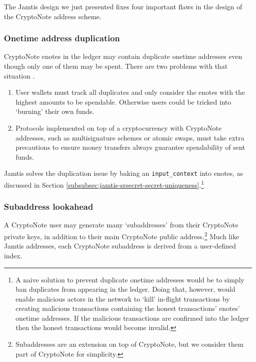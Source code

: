The Jamtis design we just presented fixes four important flaws in the design of the CryptoNote address scheme.

\subsubsection{Onetime address duplication}
\label{subsubsec:jamtis-cryptonote-flaws-duplication}

CryptoNote enotes in the ledger may contain duplicate onetime addresses even though only one of them may be spent. There are two problems with that situation \cite{burning-bug-mrl-103}.
\begin{enumerate}
    \item User wallets must track all duplicates and only consider the enotes with the highest amounts to be spendable. Otherwise users could be tricked into `burning' their own funds.
    \item Protocols implemented on top of a cryptocurrency with CryptoNote addresses, such as multisignature schemes or atomic swaps, must take extra precautions to ensure money transfers always guarantee spendability of sent funds.
\end{enumerate}

Jamtis solves the duplication issue by baking an {\tt input\_context} into enotes, as discussed in Section \ref{subsubsec:jamtis-srsecret-secret-uniqueness}.\footnote{A naive solution to prevent duplicate onetime addresses would be to simply ban duplicates from appearing in the ledger. Doing that, however, would enable malicious actors in the network to `kill' in-flight transactions by creating malicious transactions containing the honest transactions' enotes' onetime addresses. If the malicious transactions are confirmed into the ledger then the honest transactions would become invalid.}

\subsubsection{Subaddress lookahead}
\label{subsubsec:jamtis-cryptonote-flaws-subaddr-lookahead}

A CryptoNote user may generate many `subaddresses' \cite{MRL-0006-subaddresses} from their CryptoNote private keys, in addition to their main CryptoNote public address.\footnote{Subaddresses are an extension on top of CryptoNote, but we consider them part of CryptoNote for simplicity.} Much like Jamtis addresses, each CryptoNote subaddress is derived from a user-defined index.


